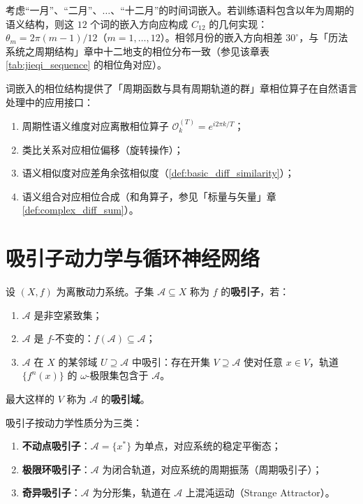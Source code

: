 \begin{example}[时间词的嵌入周期结构]\label{ex:time_word_embedding}
考虑“一月”、“二月”、$\dots$、“十二月”的时间词嵌入。若训练语料包含以年为周期的语义结构，则这 $12$ 个词的嵌入方向应构成 $C_{12}$ 的几何实现：$\theta_{m}=2\pi(m-1)/12$（$m=1,\dots,12$）。相邻月份的嵌入方向相差 $30^\circ$，与「历法系统之周期结构」章中十二地支的相位分布一致（参见该章表 \ref{tab:jieqi_sequence} 的相位角对应）。
\end{example}

\begin{remark}[词嵌入与相位算子的接口]\label{rem:embedding_phase_operator_interface}
词嵌入的相位结构提供了「周期函数与具有周期轨道的群」章相位算子在自然语言处理中的应用接口：
\begin{enumerate}[label=(\roman*)]
    \item 周期性语义维度对应离散相位算子 $\mathcal{O}_k^{(T)}=e^{i2\pi k/T}$；
    \item 类比关系对应相位偏移（旋转操作）；
    \item 语义相似度对应差角余弦相似度（\cref{def:basic_diff_similarity}）；
    \item 语义组合对应相位合成（和角算子，参见「标量与矢量」章 \cref{def:complex_diff_sum}）。
\end{enumerate}
\end{remark}

\section{吸引子动力学与循环神经网络}
\label{sec:attractor_dynamics}

\begin{definition}[吸引子与吸引域]\label{def:attractor}
设 $(X,f)$ 为离散动力系统。子集 $\mathcal{A}\subseteq X$ 称为 $f$ 的\textbf{吸引子}，若：
\begin{enumerate}[label=(\roman*)]
    \item $\mathcal{A}$ 是非空紧致集；
    \item $\mathcal{A}$ 是 $f$-不变的：$f(\mathcal{A})\subseteq\mathcal{A}$；
    \item $\mathcal{A}$ 在 $X$ 的某邻域 $U\supseteq\mathcal{A}$ 中吸引：存在开集 $V\supseteq\mathcal{A}$ 使对任意 $x\in V$，轨道 $\{f^n(x)\}$ 的 $\omega$-极限集包含于 $\mathcal{A}$。
\end{enumerate}
最大这样的 $V$ 称为 $\mathcal{A}$ 的\textbf{吸引域}。
\end{definition}

\begin{definition}[吸引子的三种基本类型]\label{def:attractor_types}
吸引子按动力学性质分为三类：
\begin{enumerate}[label=(\roman*)]
    \item \textbf{不动点吸引子}：$\mathcal{A}=\{x^*\}$ 为单点，对应系统的稳定平衡态；
    \item \textbf{极限环吸引子}：$\mathcal{A}$ 为闭合轨道，对应系统的周期振荡（周期吸引子）；
    \item \textbf{奇异吸引子}：$\mathcal{A}$ 为分形集，轨道在 $\mathcal{A}$ 上混沌运动（Strange Attractor）。
\end{enumerate}
\end{definition}

